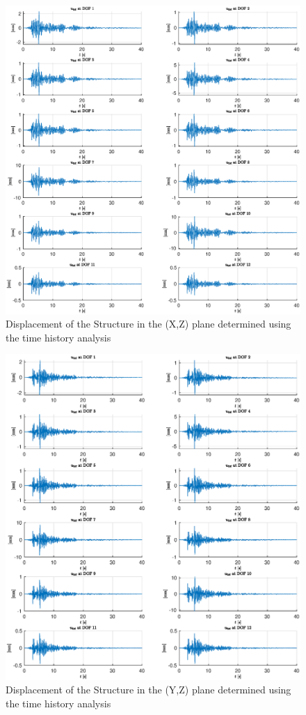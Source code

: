 \documentclass[11pt,a4paper,titlepage]{report}
\begin{document}
\begin{figure} [h]
    \centering
    \includegraphics[width=16cm]{LR_TH_Utot_x.eps}
    \caption{Displacement of the Structure in the (X,Z) plane determined using the time history analysis}
    \label{fig:LR_TH_Utot_x}
\end{figure}
\newpage
\begin{figure} [h]
    \centering
    \includegraphics[width=16cm]{LR_TH_Utot.eps}
    \caption{Displacement of the Structure in the (Y,Z) plane determined using the time history analysis}
    \label{fig:LR_TH_Utot}
\end{figure}
\end{document}
